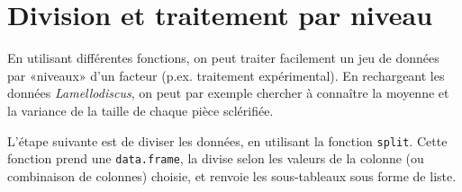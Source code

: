 \section{Division et traitement par niveau}

En utilisant différentes fonctions, on peut traiter facilement un jeu de données par «niveaux» d'un facteur (p.ex. traitement expérimental).
En rechargeant les données \emph{Lamellodiscus}, on peut par exemple chercher à connaître la moyenne et la variance de la taille de chaque pièce sclérifiée.

\begin{knitrout}
\color{fgcolor}\begin{kframe}
\begin{flushleft}
\ttfamily\noindent
{}\hlassignement{\usebox{\hlnormalsizeboxlessthan}-}{\ }\hlkeyword{(}\hlkeyword{,}{\ }\hlargument{=}{\ }\hlkeyword{,}{\ }\hlargument{=}{\ }\hlkeyword{)}\mbox{}
\normalfont
\end{flushleft}
\end{kframe}
\end{knitrout}


\noindent L'étape suivante est de diviser les données, en utilisant la fonction \texttt{split}.
Cette fonction prend une \texttt{data.frame}, la divise selon les valeurs de la colonne (ou combinaison de colonnes) choisie, et renvoie les sous-tableaux sous forme de liste.

